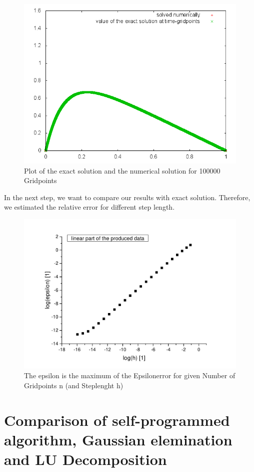 \documentclass[10pt,a4paper]{article}
\begin{document}
\begin{figure}[h]
\centering
\includegraphics[scale=0.5]{Comparisonplot100000.png}
\caption{Plot of the exact solution and the numerical solution for 100000 Gridpoints}
\label{Comparison100000}
\end{figure}

In the next step, we want to compare our results with exact solution. Therefore, we estimated the relative error for different step length. 

\begin{figure}[h]
\centering
\includegraphics[scale=0.5]{epsilon_plot_log.pdf}
\caption{The epsilon is the maximum of the Epsilonerror for given Number of Gridpoints n (and Steplenght h) }
\label{linear plot}
\end{figure}

\section{Comparison of self-programmed algorithm, Gaussian elemination and LU Decomposition }
\end{document}
